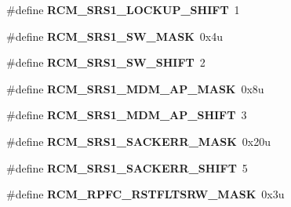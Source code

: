\begin{DoxyCompactItemize}
\item 
\hypertarget{group___r_c_m___register___masks_ga71f857503a2b2d2e0c30d4762e89a8d8}{}\#define {\bfseries R\+C\+M\+\_\+\+S\+R\+S1\+\_\+\+L\+O\+C\+K\+U\+P\+\_\+\+S\+H\+I\+F\+T}~1\label{group___r_c_m___register___masks_ga71f857503a2b2d2e0c30d4762e89a8d8}

\item 
\hypertarget{group___r_c_m___register___masks_ga72f541acd2a0992ad0d1d089c694ad5f}{}\#define {\bfseries R\+C\+M\+\_\+\+S\+R\+S1\+\_\+\+S\+W\+\_\+\+M\+A\+S\+K}~0x4u\label{group___r_c_m___register___masks_ga72f541acd2a0992ad0d1d089c694ad5f}

\item 
\hypertarget{group___r_c_m___register___masks_ga7e554c1ae96dae684fbc81204283f86c}{}\#define {\bfseries R\+C\+M\+\_\+\+S\+R\+S1\+\_\+\+S\+W\+\_\+\+S\+H\+I\+F\+T}~2\label{group___r_c_m___register___masks_ga7e554c1ae96dae684fbc81204283f86c}

\item 
\hypertarget{group___r_c_m___register___masks_ga6af4d8ed2135b602de575373f22b1af8}{}\#define {\bfseries R\+C\+M\+\_\+\+S\+R\+S1\+\_\+\+M\+D\+M\+\_\+\+A\+P\+\_\+\+M\+A\+S\+K}~0x8u\label{group___r_c_m___register___masks_ga6af4d8ed2135b602de575373f22b1af8}

\item 
\hypertarget{group___r_c_m___register___masks_ga91611da7546b27a939e92926f378229f}{}\#define {\bfseries R\+C\+M\+\_\+\+S\+R\+S1\+\_\+\+M\+D\+M\+\_\+\+A\+P\+\_\+\+S\+H\+I\+F\+T}~3\label{group___r_c_m___register___masks_ga91611da7546b27a939e92926f378229f}

\item 
\hypertarget{group___r_c_m___register___masks_gaa09459c8ed6200a5828221f9d15656d3}{}\#define {\bfseries R\+C\+M\+\_\+\+S\+R\+S1\+\_\+\+S\+A\+C\+K\+E\+R\+R\+\_\+\+M\+A\+S\+K}~0x20u\label{group___r_c_m___register___masks_gaa09459c8ed6200a5828221f9d15656d3}

\item 
\hypertarget{group___r_c_m___register___masks_gab30a0b3f954edb8a480649686bd208fb}{}\#define {\bfseries R\+C\+M\+\_\+\+S\+R\+S1\+\_\+\+S\+A\+C\+K\+E\+R\+R\+\_\+\+S\+H\+I\+F\+T}~5\label{group___r_c_m___register___masks_gab30a0b3f954edb8a480649686bd208fb}

\item 
\hypertarget{group___r_c_m___register___masks_ga36e0fc448dc94b90314dd6dd2dd41763}{}\#define {\bfseries R\+C\+M\+\_\+\+R\+P\+F\+C\+\_\+\+R\+S\+T\+F\+L\+T\+S\+R\+W\+\_\+\+M\+A\+S\+K}~0x3u\label{group___r_c_m___register___masks_ga36e0fc448dc94b90314dd6dd2dd41763}


\end{DoxyCompactItemize}
